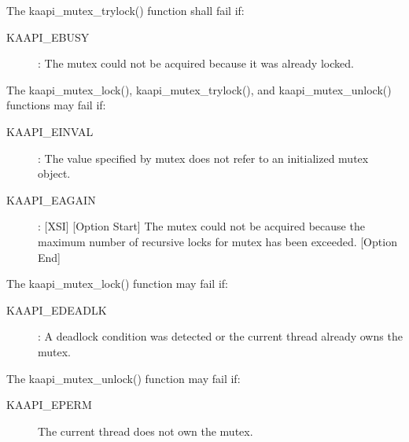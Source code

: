 \begin{description}
The kaapi\_mutex\_trylock() function shall fail if:

\begin{description}
\item [KAAPI\_EBUSY]: The mutex could not be acquired because it was already
  locked.
\end{description}

The kaapi\_mutex\_lock(), kaapi\_mutex\_trylock(), and kaapi\_mutex\_unlock()
functions may fail if:

\begin{description}
\item [KAAPI\_EINVAL]: The value specified by mutex does not refer to an
  initialized mutex object.
\item [KAAPI\_EAGAIN]: [XSI] [Option Start] The mutex could not be acquired
  because the maximum number of recursive locks for mutex has been
  exceeded. [Option End]
\end{description}

The kaapi\_mutex\_lock() function may fail if:

\begin{description}
\item [KAAPI\_EDEADLK]: A deadlock condition was detected or the current
  thread already owns the mutex.
\end{description}

The kaapi\_mutex\_unlock() function may fail if:

\begin{description}
\item [KAAPI\_EPERM]
    The current thread does not own the mutex. 
\end{description}
\end{description}
